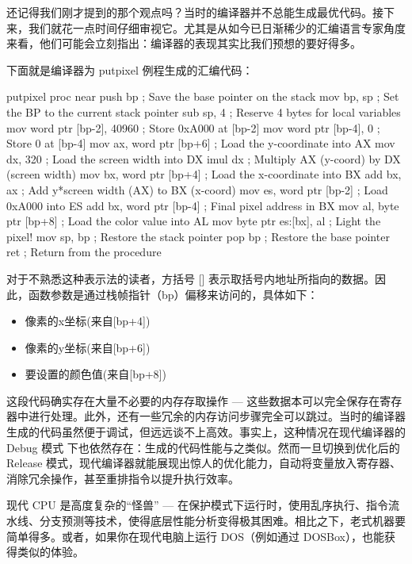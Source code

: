 还记得我们刚才提到的那个观点吗？当时的编译器并不总能生成最优代码。接下来，我们就花一点时间仔细审视它。尤其是从如今已日渐稀少的汇编语言专家角度来看，他们可能会立刻指出：编译器的表现其实比我们预想的要好得多。

下面就是编译器为 putpixel 例程生成的汇编代码：

\begin{shell}
putpixel proc near
  push bp ; Save the base pointer on the stack
  mov bp, sp ; Set the BP to the current stack pointer
  sub sp, 4 ; Reserve 4 bytes for local variables
  mov word ptr [bp-2], 40960 ; Store 0xA000 at [bp-2]
  mov word ptr [bp-4], 0 ; Store 0 at [bp-4]
  mov ax, word ptr [bp+6] ; Load the y-coordinate into AX
  mov dx, 320 ; Load the screen width into DX
  imul dx ; Multiply AX (y-coord) by DX (screen width)
  mov bx, word ptr [bp+4] ; Load the x-coordinate into BX
  add bx, ax ; Add y*screen width (AX) to BX (x-coord)
  mov es, word ptr [bp-2] ; Load 0xA000 into ES
  add bx, word ptr [bp-4] ; Final pixel address in BX
  mov al, byte ptr [bp+8] ; Load the color value into AL
  mov byte ptr es:[bx], al ; Light the pixel!
  mov sp, bp ; Restore the stack pointer
  pop bp ; Restore the base pointer
  ret ; Return from the procedure
\end{shell}

对于不熟悉这种表示法的读者，方括号 [] 表示取括号内地址所指向的数据。因此，函数参数是通过栈帧指针（bp）偏移来访问的，具体如下：

\begin{itemize}
\item 
像素的x坐标(来自[bp+4])

\item 
像素的y坐标(来自[bp+6]) 

\item 
要设置的颜色值(来自[bp+8])
\end{itemize}

这段代码确实存在大量不必要的内存存取操作 --- 这些数据本可以完全保存在寄存器中进行处理。此外，还有一些冗余的内存访问步骤完全可以跳过。当时的编译器生成的代码虽然便于调试，但远远谈不上高效。事实上，这种情况在现代编译器的 Debug 模式 下也依然存在：生成的代码性能与之类似。然而一旦切换到优化后的 Release 模式，现代编译器就能展现出惊人的优化能力，自动将变量放入寄存器、消除冗余操作，甚至重排指令以提升执行效率。

现代 CPU 是高度复杂的“怪兽” --- 在保护模式下运行时，使用乱序执行、指令流水线、分支预测等技术，使得底层性能分析变得极其困难。相比之下，老式机器要简单得多。或者，如果你在现代电脑上运行 DOS（例如通过 DOSBox），也能获得类似的体验。

